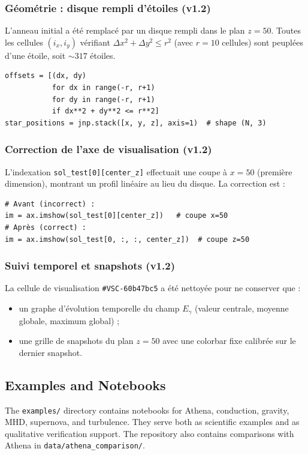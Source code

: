 \documentclass[a4paper, 11pt]{article}
\begin{document}
\subsubsection*{Géométrie : disque rempli d'étoiles (v1.2)}
L'anneau initial a été remplacé par un disque rempli dans le plan $z=50$.  
Toutes les cellules $(i_x, i_y)$ vérifiant $\Delta x^2 + \Delta y^2 \leq r^2$ (avec $r=10$ cellules) sont peuplées d'une étoile, soit $\sim 317$ étoiles.
\begin{verbatim}
offsets = [(dx, dy)
           for dx in range(-r, r+1)
           for dy in range(-r, r+1)
           if dx**2 + dy**2 <= r**2]
star_positions = jnp.stack([x, y, z], axis=1)  # shape (N, 3)
\end{verbatim}

\subsubsection*{Correction de l'axe de visualisation (v1.2)}
L'indexation \texttt{sol\_test[0][center\_z]} effectuait une coupe à $x=50$ (première dimension), montrant un profil linéaire au lieu du disque. La correction est :
\begin{verbatim}
# Avant (incorrect) :
im = ax.imshow(sol_test[0][center_z])   # coupe x=50
# Après (correct) :
im = ax.imshow(sol_test[0, :, :, center_z])  # coupe z=50
\end{verbatim}

\subsubsection*{Suivi temporel et snapshots (v1.2)}
La cellule de visualisation \texttt{\#VSC-60b47bc5} a été nettoyée pour ne conserver que :
\begin{itemize}
    \item un graphe d'évolution temporelle du champ $E_\gamma$ (valeur centrale, moyenne globale, maximum global) ;
    \item une grille de snapshots du plan $z=50$ avec une colorbar fixe calibrée sur le dernier snapshot.
\end{itemize}
\subsection{Examples and Notebooks}
The \texttt{examples/} directory contains notebooks for Athena, conduction, gravity, MHD, supernova, and turbulence. They serve both as scientific examples and as qualitative verification support. The repository also contains comparisons with Athena in \texttt{data/athena\_comparison/}.
\end{document}
